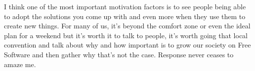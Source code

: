I think one of the most important motivation factors is to see people being able to adopt the solutions you come up with and even more when they use them to create new things. For many of us, it's beyond the comfort zone or even the ideal plan for a weekend but it's worth it to talk to people, it's worth going that local convention and talk about why and how important is to grow our society on Free Software and then gather why that's not the case. Response never ceases to amaze me.
